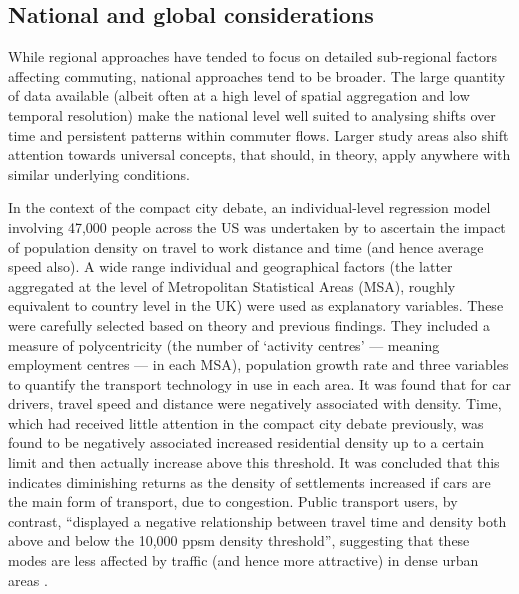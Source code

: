 
\subsection{National and global considerations}
While regional approaches have tended to focus on detailed sub-regional factors
affecting commuting, national approaches tend to be broader. The large
quantity of data available (albeit often at a high level of spatial
aggregation and low temporal resolution) make the national level
well suited to analysing shifts over time and persistent patterns within commuter
flows. Larger study areas also shift attention towards universal concepts,
that should, in theory, apply anywhere with similar underlying conditions.

In the context of the compact city debate, an individual-level regression
model involving 47,000 people across the US was undertaken by
\citet{Levtnson1997} to ascertain the impact of population density on
travel to work distance and time (and hence average speed also). A wide range
individual and geographical
factors (the latter aggregated at the level of Metropolitan Statistical
Areas (MSA), roughly equivalent to country level in the UK) were
used as explanatory variables. These were
carefully selected based on theory and previous findings. They
included a measure of polycentricity (the number of `activity centres' --- meaning
employment centres --- in each MSA), population growth rate and three variables
to quantify the transport technology in use in each area. It was found that for
car drivers, travel speed and distance were negatively associated with density. Time,
which had received little attention in the compact city debate previously, was found to be
negatively associated  increased residential density up to a certain limit
and then actually increase above this threshold. It was concluded that
this indicates diminishing returns as the density of settlements increased 
if cars are the main form of transport, due to congestion. Public
transport users, by contrast, ``displayed a negative relationship between travel
time and density both above and below the 10,000 ppsm density threshold'',
suggesting that these modes are less affected by traffic (and hence more attractive)
in dense urban areas \citep[p.~168]{Levtnson1997}.

